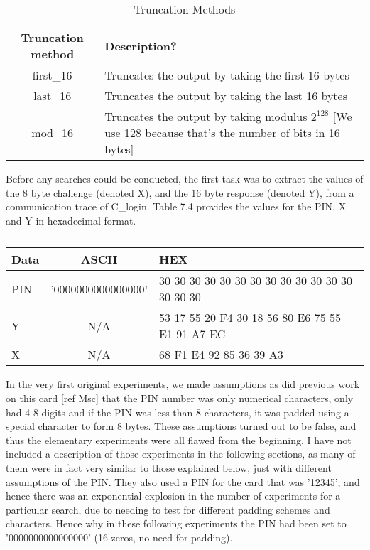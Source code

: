 \documentclass[bsc,frontabs,twoside,singlespacing,parskip,deptreport]{infthesis}     %
\begin{document}
\begin{table}[H]
\begin{center}
\begin{tabular}{|c|p{10cm}|}
\hline
Truncation method & Description?\\
\hline
first\_16 & Truncates the output by taking the first 16 bytes \\
last\_16 & Truncates the output by taking the last 16 bytes\\
mod\_16 & Truncates the output by taking modulus $2^{128}$ [We use 128 because that's the number of bits in 16 bytes]  \\
\hline
\end{tabular}
\end{center}
\caption{Truncation Methods}
\end{table}

\newpage


\noindent Before any searches could be conducted, the first task was to extract the values of the 8 byte challenge (denoted X), and the 16 byte response (denoted Y), from a communication trace of C\_login. Table 7.4 provides the values for the PIN, X and Y in hexadecimal format.\\

 
\begin{table}[H]
\begin{center}  
\begin{tabular}{|l|c|l|}
\hline
Data & ASCII & HEX\\
\hline
PIN & '0000000000000000' & 30 30 30 30 30 30 30 30 30 30 30 30 30 30 30 30\\
\hline
Y & N/A & 53 17 55 20 F4 30 18 56 80 E6 75 55 E1 91 A7 EC\\
\hline
X & N/A & 68 F1 E4 92 85 36 39 A3\\
\hline
\end{tabular}
\end{center}
\caption{}
\end{table}


In the very first original experiments, we made assumptions as did previous work on this card [ref Msc] that the PIN number was only numerical characters, only had 4-8 digits and if the PIN was less than 8 characters, it was padded using a special character to form 8 bytes. These assumptions turned out to be false, and thus the elementary experiments were all flawed from the beginning. I have not included a description of those experiments in the following sections, as many of them were in fact very similar to those explained below, just with different assumptions of the PIN. They also used a PIN for the card that was '12345', and hence there was an exponential explosion in the number of experiments for a particular search, due to needing to test for different padding schemes and characters. Hence why in these following experiments the PIN had been set to '0000000000000000' (16 zeros, no need for padding).
\end{document}
